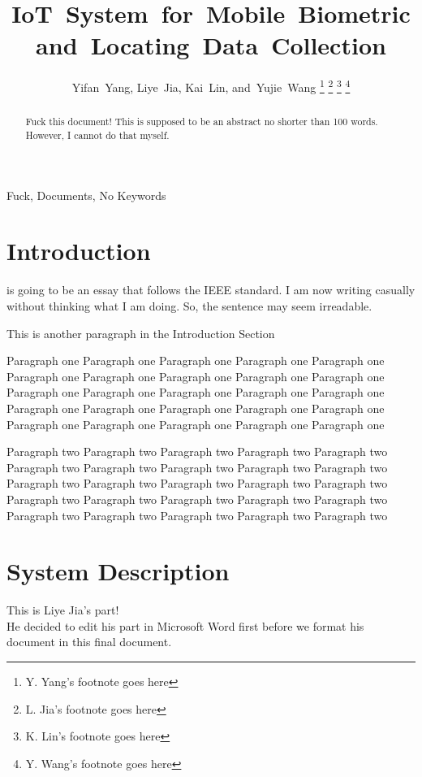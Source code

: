 \documentclass[10pt,journal,final,a4paper,nofonttune]{IEEEtran}
\title{IoT~System~for~Mobile~Biometric and~Locating~Data~Collection}
\author{Yifan~Yang,
        Liye~Jia,
        Kai~Lin,
        and~Yujie~Wang
\thanks{Y. Yang's footnote goes here}%
\thanks{L. Jia's footnote goes here}%
\thanks{K. Lin's footnote goes here}%
\thanks{Y. Wang's footnote goes here}}
\begin{document}
\maketitle

\begin{abstract}
    Fuck this document! This is supposed to be an abstract no shorter 
    than 100 words. However, I cannot do that myself.
\end{abstract}

\begin{IEEEkeywords}
    Fuck, Documents, No Keywords
\end{IEEEkeywords}


\section{Introduction}
 is going to be an essay that follows the IEEE standard.
I am now writing casually without thinking what I am doing. So, the 
sentence may seem irreadable.
\cite{gomez2012overview}

This is another paragraph in the Introduction Section

Paragraph one Paragraph one Paragraph one Paragraph one Paragraph one 
Paragraph one Paragraph one Paragraph one Paragraph one Paragraph one 
Paragraph one Paragraph one Paragraph one Paragraph one Paragraph one 
Paragraph one Paragraph one Paragraph one Paragraph one Paragraph one 
Paragraph one Paragraph one Paragraph one Paragraph one Paragraph one 

Paragraph two Paragraph two Paragraph two Paragraph two Paragraph two 
Paragraph two Paragraph two Paragraph two Paragraph two Paragraph two 
Paragraph two Paragraph two Paragraph two Paragraph two Paragraph two 
Paragraph two Paragraph two Paragraph two Paragraph two Paragraph two 
Paragraph two Paragraph two Paragraph two Paragraph two Paragraph two 




\section{System Description}






This is Liye Jia's part! \\

He decided to edit his part in Microsoft Word first 
before we format his document in this final document. \\
\end{document}
